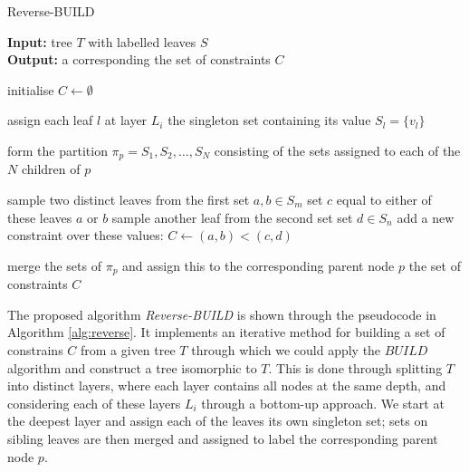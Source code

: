 \documentclass[a4paper, 11pt]{article}
\begin{document}
	\begin{algorithm}
		\caption{Reverse-BUILD}
		\label{alg:reverse}
		\textbf{Input:} tree $T$ with labelled leaves $S$ \\
		\textbf{Output:} a corresponding the set of constraints $C$
		
		\begin{algorithmic}[1]
			\STATE initialise $C \leftarrow \emptyset$
			
				
				\STATE assign each leaf $l$ at layer $L_{i}$ the singleton set containing its value $S_{l} = \{v_{l}\}$
				
					
					\STATE form the partition $\pi_{p} = S_{1}, S_{2}, \ldots, S_{N}$ consisting of the sets assigned to each of the $N$ children of $p$
					
						
							
								\STATE sample two distinct leaves from the first set $a, b \in S_{m}$
								\STATE set $c$ equal to either of these leaves $a$ or $b$
								\STATE sample another leaf from the second set set $d \in S_{n}$
								\STATE add a new constraint over these values: $C \leftarrow (a, b) < (c, d)$
							\ENDIF
							
						\ENDFOR
						
						\STATE merge the sets of $\pi_{p}$ and assign this to the corresponding parent node $p$
					\ENDFOR
				\ENDFOR
			\ENDFOR
			\RETURN the set of constraints $C$
	\end{algorithmic}
	\end{algorithm}
	
	The proposed algorithm \emph{Reverse-BUILD} is shown through the pseudocode in Algorithm \ref{alg:reverse}. It implements an iterative method for building a set of constrains $C$ from a given tree $T$ through which we could apply the $BUILD$ algorithm and construct a tree isomorphic to $T$. This is done through splitting $T$ into distinct layers, where each layer contains all nodes at the same depth, and considering each of these layers $L_{i}$ through a bottom-up approach. We start at the deepest layer and assign each of the leaves its own singleton set; sets on sibling leaves are then merged and assigned to label the corresponding parent node $p$.
	
\end{document}
